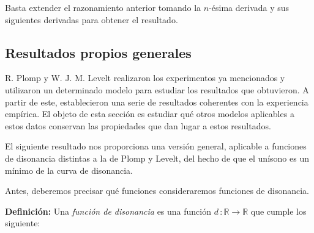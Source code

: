 \documentclass[11pt,a4paper]{article}
\begin{document}
Basta extender el razonamiento anterior tomando la $n$-ésima derivada y sus siguientes derivadas para obtener el resultado.

\blacksquare









    
	
	\subsection{Resultados propios generales}
	
	R. Plomp y W. J. M. Levelt realizaron los experimentos ya mencionados y utilizaron un determinado modelo para estudiar los resultados que obtuvieron. A partir de este, establecieron una serie de resultados coherentes con la experiencia empírica. El objeto de esta sección es estudiar qué otros modelos aplicables a estos datos conservan las propiedades que dan lugar a estos resultados.
	
	El siguiente resultado nos proporciona una versión general, aplicable a funciones de disonancia distintas a la de Plomp y Levelt, del hecho de que el unísono es un mínimo de la curva de disonancia.
	
	Antes, deberemos precisar qué funciones consideraremos funciones de disonancia.
	
	\vspace{3mm}
	
	\noindent\textbf{Definición:} Una \emph{función de disonancia} es una función $d\,: \mathbb{R} \longrightarrow \mathbb{R}$ que cumple los siguiente:
	
\end{document}
